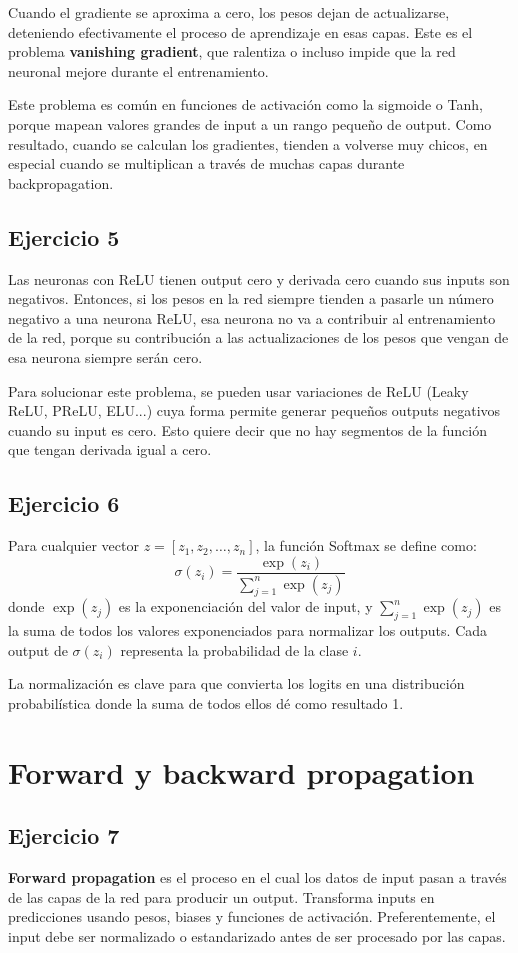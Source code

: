 \documentclass[a4paper,11pt]{article}
\begin{document}
Cuando el gradiente se aproxima a cero, los pesos dejan de actualizarse, deteniendo efectivamente el proceso de aprendizaje en esas capas. Este es el problema \textbf{vanishing gradient}, que ralentiza o incluso impide que la red neuronal mejore durante el entrenamiento.

Este problema es común en funciones de activación como la sigmoide o Tanh, porque mapean valores grandes de input a un rango pequeño de output. Como resultado, cuando se calculan los gradientes, tienden a volverse muy chicos, en especial cuando se multiplican a través de muchas capas durante backpropagation.
\subsection*{Ejercicio 5}
Las neuronas con ReLU tienen output cero y derivada cero cuando sus inputs son negativos. Entonces, si los pesos en la red siempre tienden a pasarle un número negativo a una neurona ReLU, esa neurona no va a contribuir al entrenamiento de la red, porque su contribución a las actualizaciones de los pesos que vengan de esa neurona siempre serán cero.

Para solucionar este problema, se pueden usar variaciones de ReLU (Leaky ReLU, PReLU, ELU...) cuya forma permite generar pequeños outputs negativos cuando su input es cero. Esto quiere decir que no hay segmentos de la función que tengan derivada igual a cero.
\subsection*{Ejercicio 6}
Para cualquier vector \(z = [z_{1}, z_{2}, \ldots, z_{n}]\), la función Softmax se define como: $$\sigma(z_{i}) = \frac{\exp(z_{i})}{\sum_{j=1}^{n}\exp(z_j)}$$ donde \(\exp(z_{j})\) es la exponenciación del valor de input, y \(\sum_{j=1}^{n}\exp(z_j)\) es la suma de todos los valores exponenciados para normalizar los outputs. Cada output de \(\sigma(z_{i})\) representa la probabilidad de la clase $i$.

La normalización es clave para que convierta los logits en una distribución probabilística donde la suma de todos ellos dé como resultado 1.

\section*{Forward y backward propagation}
\subsection*{Ejercicio 7}
\textbf{Forward propagation} es el proceso en el cual los datos de input pasan a través de las capas de la red para producir un output. Transforma inputs en predicciones usando pesos, biases y funciones de activación. Preferentemente, el input debe ser normalizado o estandarizado antes de ser procesado por las capas.
\end{document}
